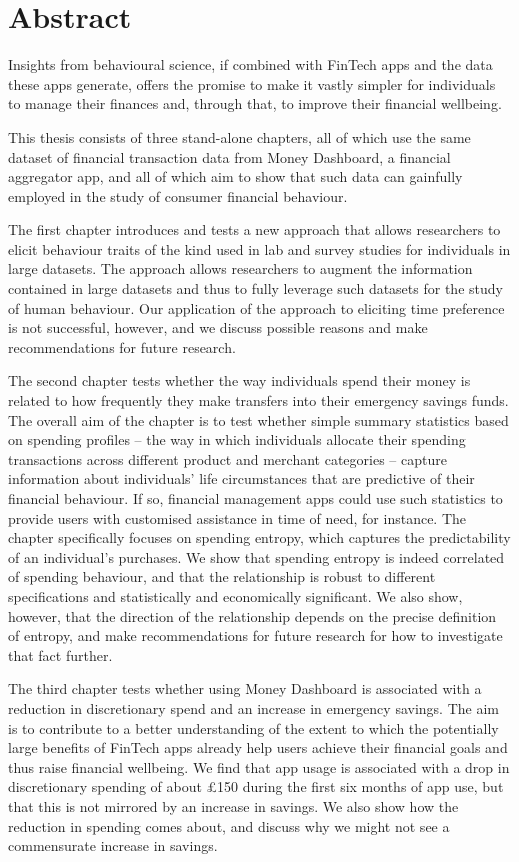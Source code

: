 
\chapter*{Abstract}%
\label{cha:abstract}

Insights from behavioural science, if combined with FinTech apps and the data
these apps generate, offers the promise to make it vastly simpler for
individuals to manage their finances and, through that, to improve their
financial wellbeing.

This thesis consists of three stand-alone chapters, all of which use the same dataset of financial transaction data from Money Dashboard, a financial aggregator app, and all of which aim to show that such data can gainfully employed in the study of consumer financial behaviour.

The first chapter introduces and tests a new approach that allows researchers to elicit behaviour traits of the kind used in lab and
survey studies for individuals in large datasets. The approach allows
researchers to augment the information contained in large datasets and thus to
fully leverage such datasets for the study of human behaviour. Our application of the approach to eliciting time preference is not successful, however, and we discuss possible reasons and make recommendations for future research.

The second
chapter tests whether the way individuals spend their money is related to how
frequently they make transfers into their emergency savings funds. The overall
aim of the chapter is to test whether simple summary statistics based on
spending profiles -- the way in which individuals allocate their spending
transactions across different product and merchant categories -- capture
information about individuals' life circumstances that are predictive of their
financial behaviour. If so, financial management apps could use such statistics
to provide users with customised assistance in time of need, for instance. The chapter specifically focuses on spending entropy, which captures the predictability of an individual's purchases. We show that spending entropy is indeed correlated of spending behaviour, and that the relationship is robust to different specifications and statistically and economically significant. We also show, however, that the direction of the relationship depends on the precise definition of entropy, and make recommendations for future research for how to investigate that fact further.

The
third chapter tests whether using Money Dashboard is associated
with a reduction in discretionary spend and an increase in emergency savings.
The aim is to contribute to a better understanding of the extent to which the
potentially large benefits of FinTech apps already help users achieve their
financial goals and thus raise financial wellbeing. We find that app usage is associated with a drop in discretionary spending of about \pounds150 during the first six months of app use, but that this is not mirrored by an increase in savings. We also show how the reduction in spending comes about, and discuss why we might not see a commensurate increase in savings.
